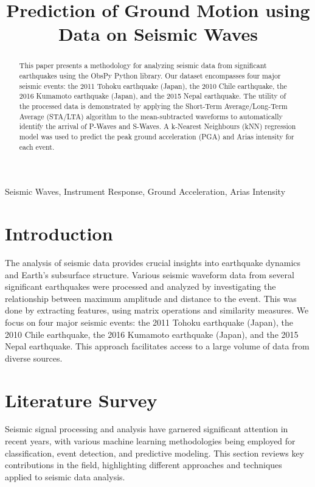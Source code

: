 \documentclass[conference]{IEEEtran}
\date{}
\title{Prediction of Ground Motion using Data on Seismic Waves}
\begin{document}
\maketitle
\begin{abstract}
This paper presents a methodology for analyzing seismic data from significant
earthquakes using the ObsPy Python library. Our dataset encompasses four major
seismic events: the 2011 Tohoku earthquake (Japan), the 2010 Chile earthquake,
the 2016 Kumamoto earthquake (Japan), and the 2015 Nepal earthquake. The utility
of the processed data is demonstrated by applying the Short-Term
Average/Long-Term Average (STA/LTA) algorithm to the mean-subtracted waveforms
to automatically identify the arrival of P-Waves and S-Waves. A k-Nearest
Neighbours (kNN) regression model was used to predict the peak ground
acceleration (PGA) and Arias intensity for each event.


\end{abstract}


\begin{IEEEkeywords}

Seismic Waves, Instrument Response, Ground Acceleration, Arias Intensity

\end{IEEEkeywords}
\section{Introduction}
\label{sec:org77d642a}
The analysis of seismic data provides crucial insights into earthquake dynamics
and Earth's subsurface structure. Various seismic waveform data from several
significant earthquakes were processed and analyzed by investigating the
relationship between maximum amplitude and distance to the event. This was done
by extracting features, using matrix operations and similarity measures. We
focus on four major seismic events: the 2011 Tohoku earthquake (Japan), the 2010
Chile earthquake, the 2016 Kumamoto earthquake (Japan), and the 2015 Nepal
earthquake. This approach facilitates access to a large volume of data from
diverse sources.
\section{Literature Survey}
\label{sec:org80d34ba}
Seismic signal processing and analysis have garnered significant attention in
recent years, with various machine learning methodologies being employed for
classification, event detection, and predictive modeling. This section reviews
key contributions in the field, highlighting different approaches and techniques
applied to seismic data analysis.
\end{document}
